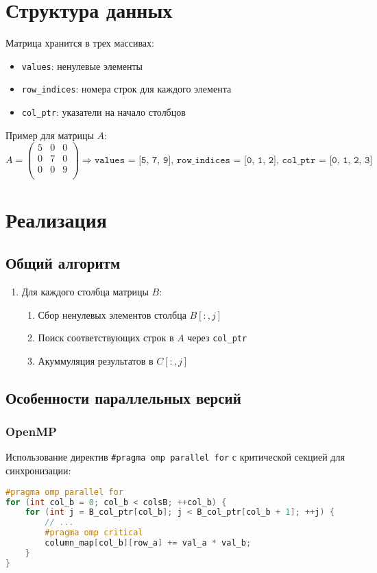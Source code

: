 \documentclass[12pt]{article}
\begin{document}
\section{Структура данных}
Матрица хранится в трех массивах:
\begin{itemize}
    \item \texttt{values}: ненулевые элементы
    \item \texttt{row\_indices}: номера строк для каждого элемента
    \item \texttt{col\_ptr}: указатели на начало столбцов
\end{itemize}

Пример для матрицы \( A \):
\[
A = \begin{pmatrix}
5 & 0 & 0 \\
0 & 7 & 0 \\
0 & 0 & 9 \\
\end{pmatrix} \Rightarrow 
\texttt{values = [5, 7, 9]}, \, 
\texttt{row\_indices = [0, 1, 2]}, \, 
\texttt{col\_ptr = [0, 1, 2, 3]}
\]

\section{Реализация}
\subsection{Общий алгоритм}
\begin{enumerate}
    \item Для каждого столбца матрицы \( B \):
    \begin{enumerate}
        \item Сбор ненулевых элементов столбца \( B[:, j] \)
        \item Поиск соответствующих строк в \( A \) через \texttt{col\_ptr}
        \item Акуммуляция результатов в \( C[:, j] \)
    \end{enumerate}
\end{enumerate}

\subsection{Особенности параллельных версий}
\subsubsection{OpenMP}
Использование директив \texttt{\#pragma omp parallel for} с критической секцией для синхронизации:
\begin{lstlisting}[language=C++, caption=Фрагмент кода OpenMP]
#pragma omp parallel for
for (int col_b = 0; col_b < colsB; ++col_b) {
    for (int j = B_col_ptr[col_b]; j < B_col_ptr[col_b + 1]; ++j) {
        // ...
        #pragma omp critical
        column_map[col_b][row_a] += val_a * val_b;
    }
}
\end{lstlisting}
\end{document}
